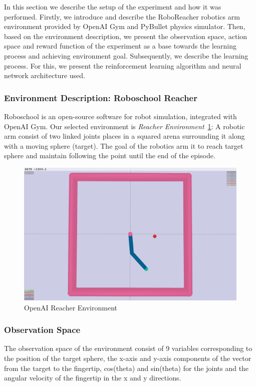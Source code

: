In this section we describe the setup of the experiment and how it was performed. Firstly, we introduce and describe the RoboReacher robotics arm environment provided by OpenAI Gym and PyBullet physics simulator. Then, based on the environment description, we present the observation space, action space and reward function of the experiment as a base towards the learning process and achieving environment goal. Subsequently, we describe the learning process. For this, we present the reinforcement learning algorithm and neural network architecture used.


\subsubsection{Environment Description: Roboschool Reacher}
Roboschool is an open-source software for robot simulation, integrated with OpenAI Gym. Our selected environment is \textit{Reacher Environment}~\ref{fig:openai_reacher}: A robotic arm consist of two linked joints places in a squared arena surrounding it along with a moving sphere (target). The goal of the robotics arm it to reach target sphere and maintain following the point until the end of the episode. 

\begin{figure}[!htb]
    \centering
        \includegraphics[width=0.7\linewidth]{figures/envs/openai_roboreacher.png}
        \caption{OpenAI Reacher Environment}
        \label{fig:openai_reacher}
\end{figure}

\subsubsection{Observation Space}

The observation space of the environment consist of 9 variables corresponding to the position of the target sphere, the x-axis and y-axis components of the vector from the target to the fingertip, cos(theta) and sin(theta) for the joints and the angular velocity of the fingertip in the x and y directions.

